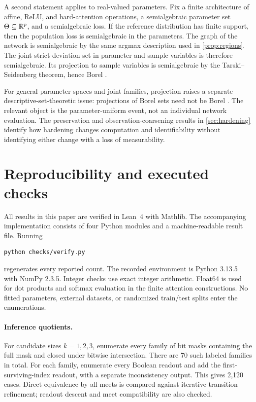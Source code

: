 A second statement applies to real-valued parameters. Fix a finite architecture of affine, ReLU, and hard-attention operations, a semialgebraic parameter set $\Theta\subseteq\mathbb R^p$, and a semialgebraic loss. If the reference distribution has finite support, then the population loss is semialgebraic in the parameters. The graph of the network is semialgebraic by the same argmax description used in \cref{prop:regions}. The joint strict-deviation set in parameter and sample variables is therefore semialgebraic. Its projection to sample variables is semialgebraic by the Tarski--Seidenberg theorem, hence Borel \citep{basu2006}.

For general parameter spaces and joint families, projection raises a separate descriptive-set-theoretic issue: projections of Borel sets need not be Borel \citep{kechris1995}. The relevant object is the parameter-uniform event, not an individual network evaluation. The preservation and observation-coarsening results in \cref{sec:hardening} identify how hardening changes computation and identifiability without identifying either change with a loss of measurability.

\section{Reproducibility and executed checks}\label{app:checks}
All results in this paper are verified in Lean~4 with Mathlib. The accompanying implementation consists of four Python modules and a machine-readable result file. Running
\begin{verbatim}
python checks/verify.py
\end{verbatim}
regenerates every reported count. The recorded environment is Python 3.13.5 with NumPy 2.3.5. Integer checks use exact integer arithmetic. Float64 is used for dot products and softmax evaluation in the finite attention constructions. No fitted parameters, external datasets, or randomized train/test splits enter the enumerations.

\paragraph{Inference quotients.}
For candidate sizes $k=1,2,3$, enumerate every family of bit masks containing the full mask and closed under bitwise intersection. There are 70 such labeled families in total. For each family, enumerate every Boolean readout and add the first-surviving-index readout, with a separate inconsistency output. This gives 2,120 cases. Direct equivalence by all meets is compared against iterative transition refinement; readout descent and meet compatibility are also checked.

